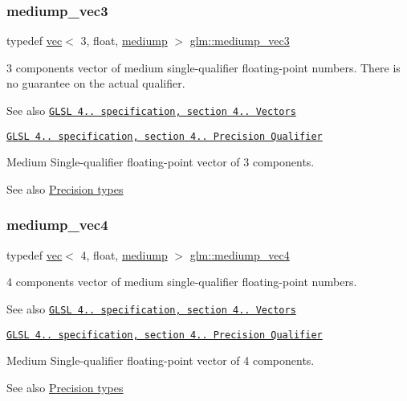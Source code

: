 \subsubsection{\texorpdfstring{mediump\+\_\+vec3}{mediump\_vec3}}
{\footnotesize\ttfamily typedef \hyperlink{structglm_1_1vec}{vec}$<$ 3, float, \hyperlink{namespaceglm_a36ed105b07c7746804d7fdc7cc90ff25a6416f3ea0c9025fb21ed50c4d6620482}{mediump} $>$ \hyperlink{group__core__precision_ga709e6ab33a5deb4a42ce9fcde75655f3}{glm\+::mediump\+\_\+vec3}}

3 components vector of medium single-\/qualifier floating-\/point numbers. There is no guarantee on the actual qualifier.

\begin{DoxySeeAlso}{See also}
\href{http://www.opengl.org/registry/doc/GLSLangSpec.4.20.8.pdf}{\tt G\+L\+SL 4.. specification, section 4.. Vectors} 

\href{http://www.opengl.org/registry/doc/GLSLangSpec.4.20.8.pdf}{\tt G\+L\+SL 4.. specification, section 4.. Precision Qualifier}
\end{DoxySeeAlso}
Medium Single-\/qualifier floating-\/point vector of 3 components. \begin{DoxySeeAlso}{See also}
\hyperlink{group__core__precision}{Precision types} 
\end{DoxySeeAlso}
\mbox{\label{group__core__precision_gaf165f9c36fb7832b79ddf7d56af3c54f}} 
\subsubsection{\texorpdfstring{mediump\+\_\+vec4}{mediump\_vec4}}
{\footnotesize\ttfamily typedef \hyperlink{structglm_1_1vec}{vec}$<$ 4, float, \hyperlink{namespaceglm_a36ed105b07c7746804d7fdc7cc90ff25a6416f3ea0c9025fb21ed50c4d6620482}{mediump} $>$ \hyperlink{group__core__precision_gaf165f9c36fb7832b79ddf7d56af3c54f}{glm\+::mediump\+\_\+vec4}}

4 components vector of medium single-\/qualifier floating-\/point numbers.

\begin{DoxySeeAlso}{See also}
\href{http://www.opengl.org/registry/doc/GLSLangSpec.4.20.8.pdf}{\tt G\+L\+SL 4.. specification, section 4.. Vectors} 

\href{http://www.opengl.org/registry/doc/GLSLangSpec.4.20.8.pdf}{\tt G\+L\+SL 4.. specification, section 4.. Precision Qualifier}
\end{DoxySeeAlso}
Medium Single-\/qualifier floating-\/point vector of 4 components. \begin{DoxySeeAlso}{See also}
\hyperlink{group__core__precision}{Precision types} 
\end{DoxySeeAlso}
\mbox{\label{group__core__precision_ga4fd29415871152bfb5abd588334147c8}} 
